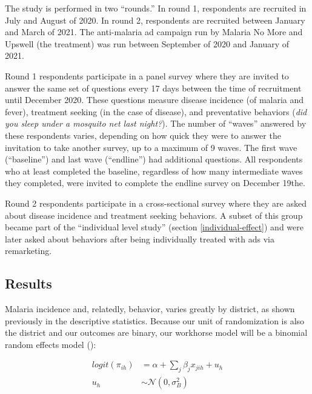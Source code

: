 \documentclass[a4paper,12pt]{article}
\begin{document}
The study is performed in two ``rounds.'' In round 1, respondents are recruited in July and August of 2020. In round 2, respondents are recruited between January and March of 2021. The anti-malaria ad campaign run by Malaria No More and Upswell (the treatment) was run between September of 2020 and January of 2021.

Round 1 respondents participate in a panel survey where they are invited to answer the same set of questions every 17 days between the time of recruitment until December 2020. These questions measure disease incidence (of malaria and fever), treatment seeking (in the case of disease), and preventative behaviors (\textit{did you sleep under a mosquito net last night?}). The number of ``waves'' answered by these respondents varies, depending on how quick they were to answer the invitation to take another survey, up to a maximum of 9 waves. The first wave (``baseline'') and last wave (``endline'') had additional questions. All respondents who at least completed the baseline, regardless of how many intermediate waves they completed, were invited to complete the endline survey on December 19the.

Round 2 respondents participate in a cross-sectional survey where they are asked about disease incidence and treatment seeking behaviors. A subset of this group became part of the ``individual level study'' (section \ref{individual-effect}) and were later asked about behaviors after being individually treated with ads via remarketing.






\subsection{Results}

Malaria incidence and, relatedly, behavior, varies greatly by district, as shown previously in the descriptive statistics. Because our unit of randomization is also the district and our outcomes are binary, our workhorse model will be a binomial random effects model (\cite{Hayes2017}):

\begin{align*}
logit(\pi_{ih}) &= \alpha + \sum_j \beta_j x_{jih} + u_h \\
u_h &\sim \mathcal{N}(0, \sigma_B^2)
\end{align*}
\end{document}
